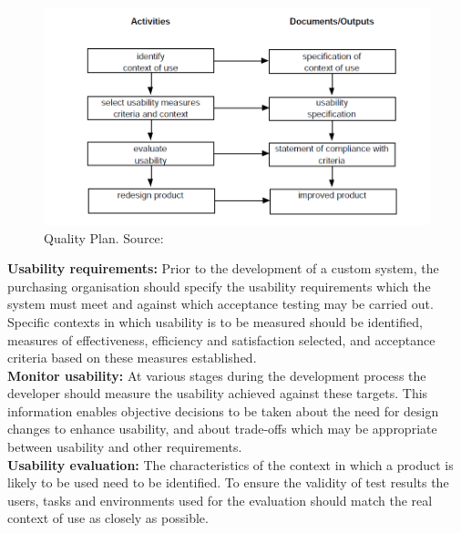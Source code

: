 \begin{figure}[H]
\caption{Quality Plan. Source: \cite{bevan1995human}}
\label{fig:usability2}
\includegraphics[scale=0.3]{img/usability2.png}
\end{figure} 

\textbf{Usability requirements:} Prior to the development of a custom system, the purchasing
organisation should specify the usability requirements which the system must meet and
against which acceptance testing may be carried out. Specific contexts in which usability is to
be measured should be identified, measures of effectiveness, efficiency and satisfaction
selected, and acceptance criteria based on these measures established. \\
\textbf{Monitor usability:} At various stages during the development process the developer should
measure the usability achieved against these targets. This information enables objective
decisions to be taken about the need for design changes to enhance usability, and about trade-offs
which may be appropriate between usability and other requirements. \\
\textbf{Usability evaluation:} The characteristics of the context in which a product is likely to be
used need to be identified. To ensure the validity of test results the users, tasks and
environments used for the evaluation should match the real context of use as closely as
possible.


